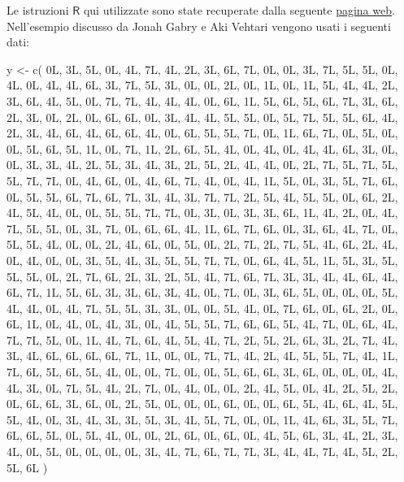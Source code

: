 \documentclass[
  11pt,
  italian,
  a4paper,
  extrafontsizes,onecolumn,openright
  ]{memoir}
\newenvironment{Shaded}{\begin{snugshade}}{\end{snugshade}}
\newcommand{\FunctionTok}[1]{\textcolor[rgb]{0.00,0.00,0.00}{#1}}
\newcommand{\NormalTok}[1]{#1}
\newcommand{\OtherTok}[1]{\textcolor[rgb]{0.56,0.35,0.01}{#1}}
\newcommand{\R}{\textsf{R}} %
\theoremstyle{definition}
\theoremstyle{definition}
\theoremstyle{definition}
\theoremstyle{definition}
\theoremstyle{remark}
\begin{document}
Le istruzioni \(\R\) qui utilizzate sono state recuperate dalla seguente \href{http://avehtari.github.io/BDA_R_demos/demos_rstan/ppc/poisson-ppc.html\#}{pagina web}. Nell'esempio discusso da Jonah Gabry e Aki Vehtari vengono usati i seguenti dati:

\begin{Shaded}
\begin{Highlighting}[]
\NormalTok{y }\OtherTok{\textless{}{-}} \FunctionTok{c}\NormalTok{(}
\NormalTok{  0L, 3L, 5L, 0L, 4L, 7L, 4L, 2L, 3L,}
\NormalTok{  6L, 7L, 0L, 0L, 3L, 7L, 5L, 5L, 0L,}
\NormalTok{  4L, 0L, 4L, 4L, 6L, 3L, 7L, 5L, 3L,}
\NormalTok{  0L, 0L, 2L, 0L, 1L, 0L, 1L, 5L, 4L,}
\NormalTok{  4L, 2L, 3L, 6L, 4L, 5L, 0L, 7L, 7L,}
\NormalTok{  4L, 4L, 4L, 0L, 6L, 1L, 5L, 6L, 5L,}
\NormalTok{  6L, 7L, 3L, 6L, 2L, 3L, 0L, 2L, 0L,}
\NormalTok{  6L, 6L, 0L, 3L, 4L, 4L, 5L, 5L, 0L,}
\NormalTok{  5L, 7L, 5L, 5L, 6L, 4L, 2L, 3L, 4L,}
\NormalTok{  6L, 4L, 6L, 6L, 4L, 0L, 6L, 5L, 5L,}
\NormalTok{  7L, 0L, 1L, 6L, 7L, 0L, 5L, 0L, 0L,}
\NormalTok{  5L, 6L, 5L, 1L, 0L, 7L, 1L, 2L, 6L,}
\NormalTok{  5L, 4L, 0L, 4L, 0L, 4L, 4L, 6L, 3L,}
\NormalTok{  0L, 0L, 3L, 3L, 4L, 2L, 5L, 3L, 4L,}
\NormalTok{  3L, 2L, 5L, 2L, 4L, 4L, 0L, 2L, 7L,}
\NormalTok{  5L, 7L, 5L, 5L, 7L, 7L, 0L, 4L, 6L,}
\NormalTok{  0L, 4L, 6L, 7L, 4L, 0L, 4L, 1L, 5L,}
\NormalTok{  0L, 3L, 5L, 7L, 6L, 0L, 5L, 5L, 6L,}
\NormalTok{  7L, 6L, 7L, 3L, 4L, 3L, 7L, 7L, 2L,}
\NormalTok{  5L, 4L, 5L, 5L, 0L, 6L, 2L, 4L, 5L,}
\NormalTok{  4L, 0L, 0L, 5L, 5L, 7L, 7L, 0L, 3L,}
\NormalTok{  0L, 3L, 3L, 6L, 1L, 4L, 2L, 0L, 4L,}
\NormalTok{  7L, 5L, 5L, 0L, 3L, 7L, 0L, 6L, 6L,}
\NormalTok{  4L, 1L, 6L, 7L, 6L, 0L, 3L, 6L, 4L,}
\NormalTok{  7L, 0L, 5L, 5L, 4L, 0L, 0L, 2L, 4L,}
\NormalTok{  6L, 0L, 5L, 0L, 2L, 7L, 2L, 7L, 5L,}
\NormalTok{  4L, 6L, 2L, 4L, 0L, 4L, 0L, 0L, 3L,}
\NormalTok{  5L, 4L, 3L, 5L, 5L, 7L, 7L, 0L, 6L,}
\NormalTok{  4L, 5L, 1L, 5L, 3L, 5L, 5L, 5L, 0L,}
\NormalTok{  2L, 7L, 6L, 2L, 3L, 2L, 5L, 4L, 7L,}
\NormalTok{  6L, 7L, 3L, 3L, 4L, 4L, 6L, 4L, 6L,}
\NormalTok{  7L, 1L, 5L, 6L, 3L, 3L, 6L, 3L, 4L,}
\NormalTok{  0L, 7L, 0L, 3L, 6L, 5L, 0L, 0L, 0L,}
\NormalTok{  5L, 4L, 4L, 0L, 4L, 7L, 5L, 5L, 3L,}
\NormalTok{  3L, 0L, 0L, 5L, 4L, 0L, 7L, 6L, 0L,}
\NormalTok{  6L, 2L, 0L, 6L, 1L, 0L, 4L, 0L, 4L,}
\NormalTok{  3L, 0L, 4L, 5L, 5L, 7L, 6L, 6L, 5L,}
\NormalTok{  4L, 7L, 0L, 6L, 4L, 7L, 7L, 5L, 0L,}
\NormalTok{  1L, 4L, 7L, 6L, 4L, 5L, 4L, 7L, 2L,}
\NormalTok{  5L, 2L, 6L, 3L, 2L, 7L, 4L, 3L, 4L,}
\NormalTok{  6L, 6L, 6L, 6L, 7L, 1L, 0L, 0L, 7L,}
\NormalTok{  7L, 4L, 2L, 4L, 5L, 5L, 7L, 4L, 1L,}
\NormalTok{  7L, 6L, 5L, 6L, 5L, 4L, 0L, 0L, 7L,}
\NormalTok{  0L, 0L, 5L, 6L, 6L, 3L, 6L, 0L, 0L,}
\NormalTok{  0L, 4L, 4L, 3L, 0L, 7L, 5L, 4L, 2L,}
\NormalTok{  7L, 0L, 4L, 0L, 0L, 2L, 4L, 5L, 0L,}
\NormalTok{  4L, 2L, 5L, 2L, 0L, 6L, 6L, 3L, 6L,}
\NormalTok{  0L, 2L, 5L, 0L, 0L, 0L, 6L, 0L, 0L,}
\NormalTok{  6L, 5L, 4L, 6L, 4L, 5L, 5L, 4L, 0L,}
\NormalTok{  3L, 4L, 3L, 3L, 5L, 3L, 4L, 5L, 7L,}
\NormalTok{  0L, 0L, 1L, 4L, 6L, 3L, 5L, 7L, 6L,}
\NormalTok{  6L, 5L, 0L, 5L, 4L, 0L, 0L, 2L, 6L,}
\NormalTok{  0L, 6L, 0L, 4L, 5L, 6L, 3L, 4L, 2L,}
\NormalTok{  3L, 4L, 0L, 5L, 0L, 0L, 0L, 0L, 3L,}
\NormalTok{  4L, 7L, 6L, 7L, 7L, 3L, 4L, 4L, 7L,}
\NormalTok{  4L, 5L, 2L, 5L, 6L}
\NormalTok{)}


\end{Highlighting}
\end{Shaded}
\end{document}
